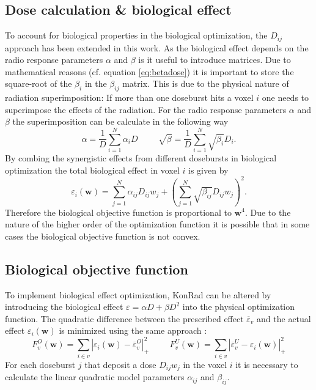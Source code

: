 \subsection{Dose calculation \& biological effect}
To account for biological properties in the biological optimization, the $D_{ij}$ approach has been extended in this work. As the biological effect depends on the radio response parameters $\alpha$ and $\beta$ is it useful to introduce matrices. Due to mathematical reasons (cf. equation \ref{eq:betadose}) it is important to store the square-root of the $\beta_i$ in the $\beta_{ij}$ matrix. This is due to the physical nature of radiation superimposition: If more than one doseburst hits a voxel $i$ one needs to superimpose the effects of the radiation. For the radio response parameters $\alpha$ and $\beta$ the superimposition can be calculate in the following way \cite{pmid7413933} \cite{pmid16757867}
\begin{equation}\label{eq:betadose}
\alpha = \frac{1}{D}\sum\limits_{i=1}^N\alpha_i D\hspace{1cm}\sqrt{\beta} = \frac{1}{D}\sum\limits_{i=1}^N\sqrt{\beta_i}D_i.
\end{equation}
By combing the synergistic effects from different dosebursts in biological optimization the total biological effect in voxel $i$ is given by \cite{pmid16757867}
\begin{equation}
\varepsilon_i(\mathbf{w}) = \sum\limits_{j=1}^N\alpha_{ij}D_{ij}w_j+\left(\sum\limits_{j=1}^N\sqrt{\beta_{ij}}D_{ij}w_j\right)^2.
\end{equation}
Therefore the biological objective function is proportional to $\mathbf{w}^4$. Due to the nature of the higher order of the optimization function it is possible that in some cases the biological objective function is not convex\cite{FreseThesis}.
\subsection{Biological objective function}
To implement biological effect optimization, KonRad can be altered by introducing the biological effect $\varepsilon = \alpha D + \beta D^2$ into the physical optimization function. The quadratic difference between the prescribed effect $\overline{\varepsilon}_v$ and the actual effect $\varepsilon_i(\mathbf{w})$ is minimized using the same approach \cite{FreseThesis}:
\begin{equation}
F_v^O (\mathbf{w}) = \sum\limits_{i\in v} \left|\varepsilon_i(\mathbf{w})-\overline{\varepsilon}_v^O\right|_+^2\hspace{1cm}F_v^U (\mathbf{w}) = \sum\limits_{i\in v} \left|\overline{\varepsilon}_v^U-\varepsilon_i(\mathbf{w})\right|_+^2
\end{equation}
For each doseburst $j$ that deposit a dose $D_{ij}w_j$ in the voxel $i$ it is necessary to calculate the linear quadratic model parameters $\alpha_{ij}$ and $\beta_{ij}$.
